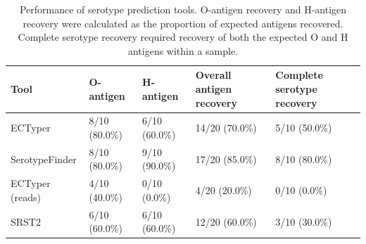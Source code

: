 \begin{table}[!ht]
\centering
\caption{Performance of serotype prediction tools. O-antigen recovery and H-antigen recovery were calculated as the proportion of expected antigens recovered. Complete serotype recovery required recovery of both the expected O and H antigens within a sample.}
\label{tab:serotype_summary}

\begin{tabular}{lllll}
\toprule
Tool & O-antigen & H-antigen & Overall antigen recovery & Complete serotype recovery\\
\midrule
ECTyper & 8/10 (80.0\%) & 6/10 (60.0\%) & 14/20 (70.0\%) & 5/10 (50.0\%)\\
SerotypeFinder & 8/10 (80.0\%) & 9/10 (90.0\%) & 17/20 (85.0\%) & 8/10 (80.0\%)\\
ECTyper (reads) & 4/10 (40.0\%) & 0/10 (0.0\%) & 4/20 (20.0\%) & 0/10 (0.0\%)\\
SRST2 & 6/10 (60.0\%) & 6/10 (60.0\%) & 12/20 (60.0\%) & 3/10 (30.0\%)\\
\bottomrule
\end{tabular}
\end{table}
